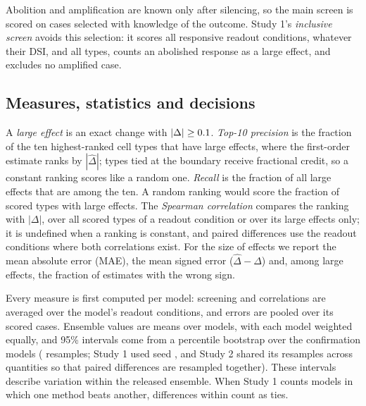 Abolition and amplification are known only after silencing, so the main screen is scored on cases selected with knowledge of the outcome. Study 1's \emph{inclusive screen} avoids this selection: it scores all \Responsive{} responsive readout conditions, whatever their DSI, and all \NetTypes{} types, counts an abolished response as a large effect, and excludes no amplified case.

\subsection{Measures, statistics and decisions}
\label{sec:measures}

A \emph{large effect} is an exact change with $|\Delta|\ge0.1$. \emph{Top-10 precision} is the fraction of the ten highest-ranked cell types that have large effects, where the first-order estimate ranks by $|\hat\Delta|$; types tied at the boundary receive fractional credit, so a constant ranking scores like a random one. \emph{Recall} is the fraction of all large effects that are among the ten. A random ranking would score the fraction of scored types with large effects. The \emph{Spearman correlation} compares the ranking with $|\Delta|$, over all scored types of a readout condition or over its large effects only; it is undefined when a ranking is constant, and paired differences use the readout conditions where both correlations exist. For the size of effects we report the mean absolute error (MAE), the mean signed error ($\hat\Delta-\Delta$) and, among large effects, the fraction of estimates with the wrong sign.

Every measure is first computed per model: screening and correlations are averaged over the model's readout conditions, and errors are pooled over its scored cases. Ensemble values are means over models, with each model weighted equally, and 95\% intervals come from a percentile bootstrap over the \NConfModels{} confirmation models (\BootstrapReps{} resamples; Study 1 used seed \BootstrapSeed{}, and Study 2 shared its resamples across quantities so that paired differences are resampled together). These intervals describe variation within the released ensemble. When Study 1 counts models in which one method beats another, differences within \TieTolerance{} count as ties.

